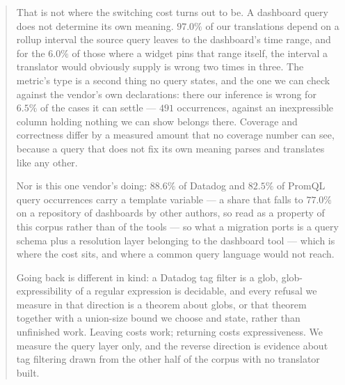 \begin{abstract}
That is not where the switching cost turns out to be. A dashboard query does not determine
its own meaning. $97.0\%$ of our translations depend on a rollup interval the source query
leaves to the dashboard's time range, and for the $6.0\%$ of those where a widget pins that
range itself, the interval a translator would obviously supply is wrong two times in three.
The metric's type is a second thing no query states, and the one we can check against the
vendor's own declarations: there our inference is wrong for $6.5\%$ of the cases it can
settle --- $491$ occurrences, against an inexpressible column holding nothing we can show
belongs there.
Coverage and correctness differ by a measured amount that no coverage number can see,
because a query that does not fix its own meaning parses and translates like any other.

Nor is this one vendor's doing: $88.6\%$ of Datadog and $82.5\%$ of PromQL query
occurrences carry a template variable --- a share that falls to $77.0\%$ on a
repository of dashboards by other authors, so read as a property of this corpus
rather than of the tools --- so what a migration ports is a query schema plus a
resolution layer belonging to the dashboard tool --- which is where the cost sits, and
where a common query language would not reach.

Going back is different in kind: a Datadog tag filter is a glob, glob-expressibility of a
regular expression is decidable, and every refusal we measure in that direction is a
theorem about globs, or that theorem together with a union-size bound we choose and
state, rather than unfinished work. Leaving costs work; returning costs
expressiveness. We measure the query layer only, and the reverse direction is evidence
about tag filtering drawn from the other half of the corpus with no translator built.
\end{abstract}

\setcounter{tocdepth}{2}
\tableofcontents
\clearpage













